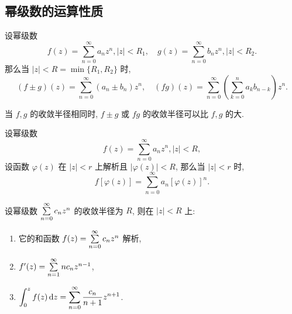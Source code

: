 % 
% 

% 

\subsection{幂级数的运算性质}

\begin{theorem}
	设幂级数
	\[f(z)=\sum_{n=0}^\infty a_nz^n,|z|<R_1,\quad
	g(z)=\sum_{n=0}^\infty b_nz^n,|z|<R_2.\]
	{那么当 $|z|<R=\min\{R_1,R_2\}$ 时,
	\[(f\pm g)(z)=\sum_{n=0}^\infty (a_n\pm b_n)z^n,\quad
	(fg)(z)=\sum_{n=0}^\infty\left(\sum_{k=0}^na_kb_{n-k}\right)z^n.\]}
\end{theorem}

当 $f,g$ 的收敛半径相同时, $f\pm g$ 或 $fg$ 的收敛半径可以比 $f,g$ 的大.

\begin{theorem}
	设幂级数
	\[f(z)=\sum_{n=0}^\infty a_nz^n,|z|<R,\]
	设函数 $\varphi(z)$ 在 $|z|<r$ 上解析且 $|\varphi(z)|<R$, 
	{那么当 $|z|<r$ 时,
	\[f[\varphi(z)]=\sum_{n=0}^\infty a_n[\varphi(z)]^n.\]}
\end{theorem}

\begin{theorem}
	设幂级数 $\sum\limits_{n=0}^\infty c_nz^n$ 的收敛半径为 $R$, 则在 $|z|<R$ 上:
	\begin{enumerate}
		\item 它的和函数 $f(z)=\sum\limits_{n=0}^\infty c_nz^n$ 解析,
		\item $f'(z)=\sum\limits_{n=1}^\infty nc_nz^{n-1}$,
		\item $\displaystyle\int_0^zf(z)\,\mathrm{d} z=\sum_{n=0}^\infty \frac{c_n}{n+1}z^{n+1}$.
	\end{enumerate}
\end{theorem}

